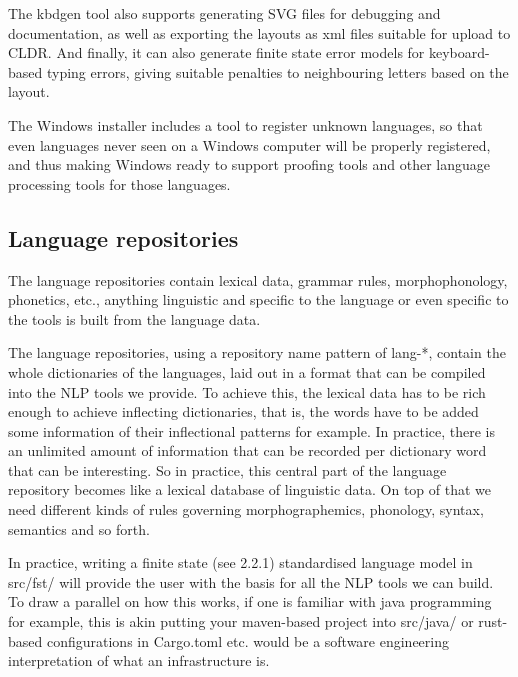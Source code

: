 \documentclass[free]{flammie}
\begin{document}
The kbdgen tool also supports generating SVG files for debugging and documentation,
as well as exporting the layouts as xml files suitable for upload to CLDR. And finally, it
can also generate finite state error models for keyboard-based typing errors, giving suitable
penalties to neighbouring letters based on the layout.

The Windows installer includes a tool to register unknown languages, so that even languages never seen on a Windows computer will be properly registered, and thus making
Windows ready to support proofing tools and other language processing tools for those
languages.

\subsection{Language repositories}

The language repositories contain lexical data, grammar rules, morphophonology, phonetics, etc., anything linguistic and specific to the language or even specific to the tools is built
from the language data.

The language repositories, using a repository name pattern of lang-*, contain the
whole dictionaries of the languages, laid out in a format that can be compiled into the NLP
tools we provide. To achieve this, the lexical data has to be rich enough to achieve inflecting
dictionaries, that is, the words have to be added some information of their inflectional patterns for example. In practice, there is an unlimited amount of information that can be recorded per dictionary word that can be interesting. So in practice, this central part of the
language repository becomes like a lexical database of linguistic data. On top of that we
need different kinds of rules governing morphographemics, phonology, syntax, semantics
and so forth.

In practice, writing a finite state (see 2.2.1) standardised language model in src/fst/ will provide
the user with the basis for all the NLP tools we can
build. To draw a parallel on how this works, if one is
familiar with java programming for example, this is
akin putting your maven-based project into
src/java/ or rust-based configurations in
Cargo.toml etc. would be a software engineering
interpretation of what an infrastructure is.
\end{document}
